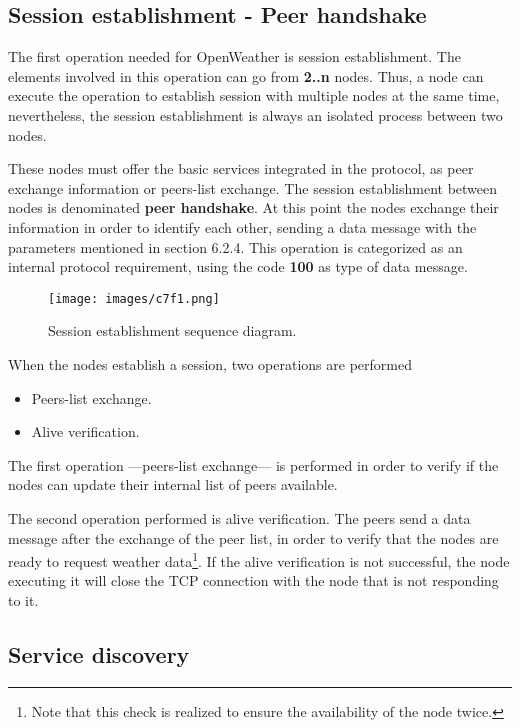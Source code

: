 \subsection{Session establishment - Peer handshake}\label{7.3.1}

The first operation needed for OpenWeather is session establishment. The elements involved in this operation can go from \textbf{2..n} nodes. Thus, a node can execute the operation to establish session with multiple nodes at the same time, nevertheless, the session establishment is always an isolated process between two nodes.

These nodes must offer the basic services integrated in the protocol, as peer exchange information or peers-list exchange. The session establishment between nodes is denominated \textbf{peer handshake}. At this point the nodes exchange their information in order to identify each other, sending a data message with the parameters mentioned in section 6.2.4. This operation is categorized as an internal protocol requirement, using the code \textbf{100} as type of data message.

\begin{figure}[H]
\centerline{\texttt{[image: images/c7f1.png]}}
\caption{Session establishment sequence diagram.}
\end{figure}

When the nodes establish a session, two operations are performed

\begin{itemize}
\item	Peers-list exchange.
\item Alive verification.
\end{itemize}

The first operation —peers-list exchange— is performed in order to verify if the nodes can update their internal list of peers available.

The second operation performed is alive verification. The peers send a data message after the exchange of the peer list, in order to verify that the nodes are ready to request weather data\footnote{Note that this check is realized to ensure the availability of the node twice.}. If the alive verification is not successful, the node executing it will close the \gls{TCP} connection with the node that is not responding to it.

\subsection{Service discovery}\label{6.3.2}

